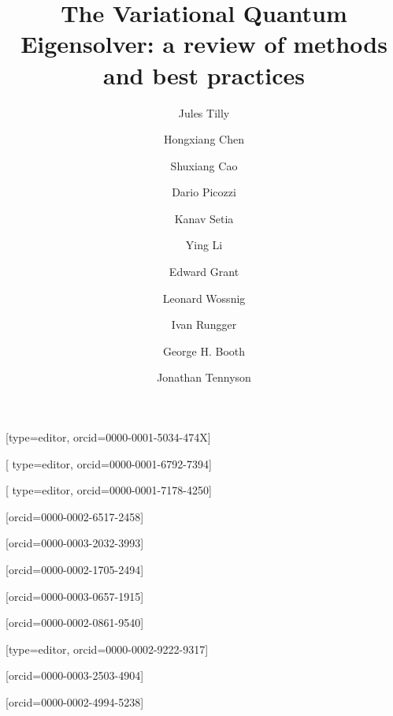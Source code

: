 \documentclass[a4paper,fleqn]{cas-sc}
\begin{document}


\shortauthors{\phantom{}} %

\title[mode=title]{The Variational Quantum Eigensolver: a review of methods and best practices}

\author[1,2]{Jules Tilly}[type=editor,
                        orcid=0000-0001-5034-474X]
\author[2,3]{Hongxiang Chen}[
    type=editor, orcid=0000-0001-6792-7394]
\author[2,4]{Shuxiang Cao}[
    type=editor, orcid=0000-0001-7178-4250]
\author[1,2]{Dario Picozzi}[orcid=0000-0002-6517-2458]
\author[5]{Kanav Setia}[orcid=0000-0003-2032-3993]
\author[6]{Ying Li}[orcid=0000-0002-1705-2494]
\author[2,3]{Edward Grant}[orcid=0000-0003-0657-1915]
\author[2,3]{Leonard Wossnig}[orcid=0000-0002-0861-9540]
\author[7]{Ivan Rungger}[type=editor,
                        orcid=0000-0002-9222-9317]
\author[8]{George H. Booth}[orcid=0000-0003-2503-4904]
\author[1]{Jonathan Tennyson}[orcid=0000-0002-4994-5238]


\address[1]{University College London, Department of Physics and Astronomy, WC1E 6BT London, United  Kingdom}
\address[2]{Odyssey Therapeutics, WC1X 8BB London,  United  Kingdom}
\address[3]{University College London, Department of Computer Science, WC1E 6BT London, United  Kingdom}
\address[4]{University of Oxford, Department of Physics, Clarendon Laboratory, OX1 3PU, United  Kingdom}
\address[5]{qBraid, 5235, Harper Court, Chicago, IL}
\address[6]{Graduate School of China Academy of Engineering Physics, Beijing 100193, China}
\address[7]{National Physical Laboratory, TW11 0LW Teddington, United Kingdom}
\address[8]{King's College London, Department of Physics, Strand, London, WC2R 2LS, United  Kingdom}
\end{document}
